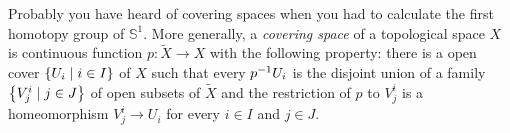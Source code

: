 \begin{example}
  Probably you have heard of covering spaces when you had to calculate
  the first homotopy group of \(\mathbb S^1\). More generally, a {\em
    covering space} of a topological space \(X\) is continuous
  function \(p : \tilde X \to X\) with the following property: there
  is a open cover \(\left\{U_i \mid i \in I\right\}\) of \(X\) such that every
  \(p^{-1} U_i\) is the disjoint union of a family
  \(\left\{V_j^i \mid j \in J\right\}\) of open subsets of \(\tilde X\) and the
  restriction of \(p\) to \(V_j^i\) is a homeomorphism
  \(V_j^i \to U_i\) for every \(i \in I\) and \(j \in
  J\). 
\end{example}

\begin{example}
\end{example}

